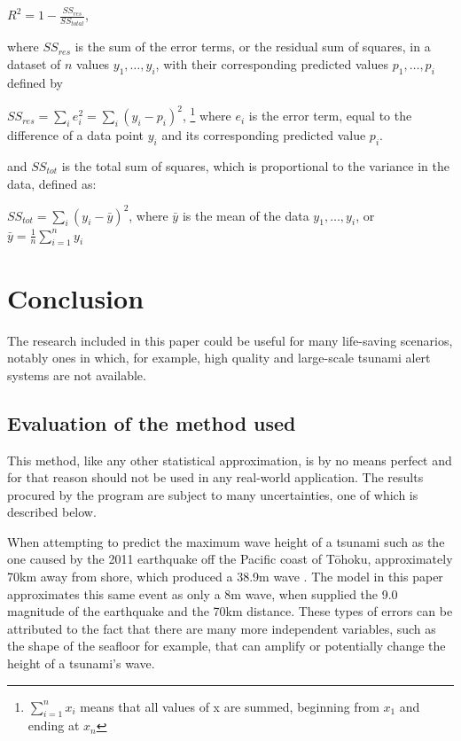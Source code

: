 \documentclass[11pt,letterpaper]{article}
\begin{document}
$R^2 = 1 - \frac{SS_{res}}{SS_{total}}$,

where $SS_{res}$ is the sum of the error terms, or the residual sum of squares, in a dataset of $n$
values $y_1,\dots, y_i$, with their corresponding predicted values $p_1,\dots, p_i$ defined by

$SS_{res} = \sum_{i} e_i^2 = \sum_{i} (y_i - p_i)^2$, \footnote{$\sum_{i=1}^n x_i$ means that all values of
    x are summed, beginning from $x_1$ and ending at $x_n$} where $e_i$ is the error term, equal to the difference of a data point $y_i$
and its corresponding predicted value $p_i$.

and $SS_{tot}$ is the total sum of squares, which is proportional to the variance in the data,
defined as:

$SS_{tot} = \sum_{i} (y_i - \bar y)^2$, where $\bar y$ is the mean of the data $y_1,\dots, y_i$,
or $\bar y = \frac{1}{n} \sum_{i=1}^n y_i$



\section{Conclusion}

The research included in this paper could be useful for many life-saving scenarios,
notably ones in which, for example, high quality and large-scale tsunami alert
systems are not available.

\subsection{Evaluation of the method used}

This method, like any other statistical approximation, is by no means perfect
and for that reason should not be used in any real-world application. The results
procured by the program are subject to many uncertainties, one of which is described
below.

When attempting to predict the maximum wave height of a tsunami such as the one
caused by the 2011 earthquake off the Pacific coast of Tōhoku, approximately 70km
away from shore, which produced a 38.9m wave \cite{yomiuri_2011}. The model in this
paper approximates this same event as only a 8m wave, when supplied the 9.0 magnitude
of the earthquake and the 70km distance. These types of errors can be attributed to the
fact that there are many more independent variables, such as the shape of the seafloor for
example, that can amplify or potentially change the height of a tsunami's wave.
\end{document}
